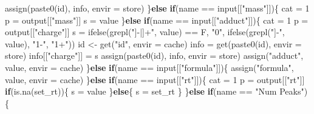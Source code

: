 \documentclass[
]{article}
\newenvironment{Shaded}{\begin{snugshade}}{\end{snugshade}}
\newcommand{\AttributeTok}[1]{\textcolor[rgb]{0.77,0.63,0.00}{#1}}
\newcommand{\ControlFlowTok}[1]{\textcolor[rgb]{0.13,0.29,0.53}{\textbf{#1}}}
\newcommand{\DecValTok}[1]{\textcolor[rgb]{0.00,0.00,0.81}{#1}}
\newcommand{\FunctionTok}[1]{\textcolor[rgb]{0.00,0.00,0.00}{#1}}
\newcommand{\NormalTok}[1]{#1}
\newcommand{\OtherTok}[1]{\textcolor[rgb]{0.56,0.35,0.01}{#1}}
\newcommand{\SpecialCharTok}[1]{\textcolor[rgb]{0.00,0.00,0.00}{#1}}
\newcommand{\StringTok}[1]{\textcolor[rgb]{0.31,0.60,0.02}{#1}}
\begin{document}
\begin{Shaded}
\begin{Highlighting}[]
      \FunctionTok{assign}\NormalTok{(}\FunctionTok{paste0}\NormalTok{(id), info, }\AttributeTok{envir =}\NormalTok{ store)}
\NormalTok{    \}}\ControlFlowTok{else} \ControlFlowTok{if}\NormalTok{(name }\SpecialCharTok{==}\NormalTok{ input[[}\StringTok{"mass"}\NormalTok{]])\{}
\NormalTok{      cat }\OtherTok{=} \DecValTok{1}
\NormalTok{      p }\OtherTok{=}\NormalTok{ output[[}\StringTok{"mass"}\NormalTok{]]}
\NormalTok{      s }\OtherTok{=}\NormalTok{ value}
\NormalTok{    \}}\ControlFlowTok{else} \ControlFlowTok{if}\NormalTok{(name }\SpecialCharTok{==}\NormalTok{ input[[}\StringTok{"adduct"}\NormalTok{]])\{}
\NormalTok{      cat }\OtherTok{=} \DecValTok{1}
\NormalTok{      p }\OtherTok{=}\NormalTok{ output[[}\StringTok{"charge"}\NormalTok{]]}
\NormalTok{      s }\OtherTok{=} \FunctionTok{ifelse}\NormalTok{(}\FunctionTok{grepl}\NormalTok{(}\StringTok{"]{-}|]+"}\NormalTok{, value) }\SpecialCharTok{==}\NormalTok{ F, }\StringTok{"0"}\NormalTok{,}
        \FunctionTok{ifelse}\NormalTok{(}\FunctionTok{grepl}\NormalTok{(}\StringTok{"]{-}"}\NormalTok{, value), }\StringTok{"1{-}"}\NormalTok{, }\StringTok{"1+"}\NormalTok{))}
\NormalTok{      id }\OtherTok{\textless{}{-}} \FunctionTok{get}\NormalTok{(}\StringTok{"id"}\NormalTok{, }\AttributeTok{envir =}\NormalTok{ cache)}
\NormalTok{      info }\OtherTok{=} \FunctionTok{get}\NormalTok{(}\FunctionTok{paste0}\NormalTok{(id), }\AttributeTok{envir =}\NormalTok{ store)}
\NormalTok{      info[[}\StringTok{"charge"}\NormalTok{]] }\OtherTok{=}\NormalTok{ s}
      \FunctionTok{assign}\NormalTok{(}\FunctionTok{paste0}\NormalTok{(id), info, }\AttributeTok{envir =}\NormalTok{ store)}
      \FunctionTok{assign}\NormalTok{(}\StringTok{"adduct"}\NormalTok{, value, }\AttributeTok{envir =}\NormalTok{ cache)}
\NormalTok{    \}}\ControlFlowTok{else} \ControlFlowTok{if}\NormalTok{(name }\SpecialCharTok{==}\NormalTok{ input[[}\StringTok{"formula"}\NormalTok{]])\{}
      \FunctionTok{assign}\NormalTok{(}\StringTok{"formula"}\NormalTok{, value, }\AttributeTok{envir =}\NormalTok{ cache)}
\NormalTok{    \}}\ControlFlowTok{else} \ControlFlowTok{if}\NormalTok{(name }\SpecialCharTok{==}\NormalTok{ input[[}\StringTok{"rt"}\NormalTok{]])\{}
\NormalTok{      cat }\OtherTok{=} \DecValTok{1}
\NormalTok{      p }\OtherTok{=}\NormalTok{ output[[}\StringTok{"rt"}\NormalTok{]]}
      \ControlFlowTok{if}\NormalTok{(}\FunctionTok{is.na}\NormalTok{(set\_rt))\{}
\NormalTok{        s }\OtherTok{=}\NormalTok{ value}
\NormalTok{      \}}\ControlFlowTok{else}\NormalTok{\{}
\NormalTok{        s }\OtherTok{=}\NormalTok{ set\_rt}
\NormalTok{      \}}
\NormalTok{    \}}\ControlFlowTok{else} \ControlFlowTok{if}\NormalTok{(name }\SpecialCharTok{==} \StringTok{"Num Peaks"}\NormalTok{)\{}

\end{Highlighting}
\end{Shaded}
\end{document}

